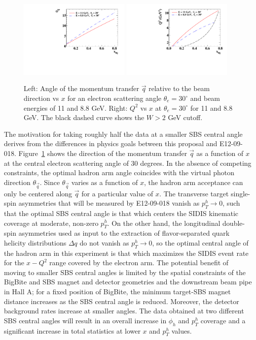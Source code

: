 \begin{figure}[h]
  \begin{center}
    \includegraphics[width=0.48\textwidth]{figures/thqxfig.pdf}
    \includegraphics[width=0.48\textwidth]{figures/Q2xfig.pdf}
  \end{center}
  \caption{\label{fig:thqx} Left: Angle of the momentum transfer $\vec{q}$ relative to the beam direction vs $x$ for an electron scattering angle $\theta_e = 30^\circ $ and beam energies of 11 and 8.8 GeV. Right: $Q^2$ vs $x$ at $\theta_e = 30^\circ$ for 11 and 8.8 GeV. The black dashed curve shows the $W > 2$ GeV cutoff.}
\end{figure}
The motivation for taking roughly half the data at a smaller SBS central angle derives from the differences in physics goals between this proposal and E12-09-018. Figure~\ref{fig:thqx} shows the direction of the momentum transfer $\vec{q}$ as a function of $x$ at the central electron scattering angle of 30 degrees. In the absence of competing constraints, the optimal hadron arm angle coincides with the virtual photon direction $\theta_{\vec{q}}$. Since $\theta_{\vec{q}}$ varies as a function of $x$, the hadron arm acceptance can only be centered along $\vec{q}$ for a particular value of $x$. The transverse target single-spin asymmetries that will be measured by E12-09-018 vanish as $p_T^h \rightarrow 0$, such that the optimal SBS central angle is that which centers the SIDIS kinematic coverage at moderate, non-zero $p_T^h$. On the other hand, the longitudinal double-spin asymmetries used as input to the extraction of flavor-separated quark helicity distributions $\Delta q$ do not vanish as $p_T^h \rightarrow 0$, so the optimal central angle of the hadron arm in this experiment is that which maximizes the SIDIS event rate for the $x-Q^2$ range covered by the electron arm. The potential benefit of moving to smaller SBS central angles is limited by the spatial constraints of the BigBite and SBS magnet and detector geometries and the downstream beam pipe in Hall A; for a fixed position of BigBite, the minimum target-SBS magnet distance increases as the SBS central angle is reduced. Moreover, the detector background rates increase at smaller angles. The data obtained at two different SBS central angles will result in an overall increase in $\phi_h$ and $p_T^h$ coverage and a significant increase in total statistics at lower $x$ and $p_T^h$ values. 
